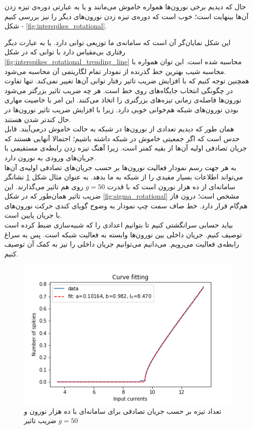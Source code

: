 حال که دیدیم برخی نورون‌ها همواره خاموش می‌مانند و یا به عبارتی دوره‌ی تیزه زدن آن‌ها بینهایت است؛ خوب است که دوره‌ی تیزه زدن‌ نورون‌های دیگر را نیز بررسی کنیم - شکل \ref{fig:interspikes_rotational}.

این شکل نمایان‌گر آن است که سامانه‌ی ما توزیعی توانی دارد. یا به عبارت دیگر رفتاری بی‌مقیاس دارد با توانی که در شکل  
\ref{fig:interspikes_rotational_trending_line}
محاسبه شده است. این توان همواره با محاسبه شیب بهترین خط گذرنده از نمودار تمام لگاریتمی آن محاسبه می‌شود.\\

همچنین توجه کنیم که با افزایش ضریب تاثیر رفتار توانی آن‌ها تغییر نمی‌کند. تنها تفاوت در چگونگی انتخاب جایگاه‌های روی خط است. هر چه ضریب تاثیر بزرگتر می‌شود نورون‌ها فاصله‌ی زمانی تیزه‌های بزرگتری را اتخاذ می‌کنند. این امر با خاصیت مهاری بودن نورون‌های شبکه هم‌خوانی خوبی دارد. زیرا با افزایش ضریب تاثیر نورون‌ها در حال کندتر شدن هستند.
\\


همان طور که دیدیم تعدادی از نورون‌ها در شبکه به حالت خاموش درمی‌آیند. قابل حدس است که اگر جمعیتی خاموش در شبکه داشته باشیم؛ احتمالا آنهایی هستند که جریان تصادفی اولیه آن‌ها از بقیه کمتر است. زیرا آهنگ تیزه زدن رابطه‌ی مستقیمی با جریان‌های ورودی به نورون دارد.\\

به هر جهت رسم نمودار فعالیت نورون‌ها بر حسب جریان‌های تصادفی اولیه‌ی آن‌ها می‌تواند اطلاعات بسیار مفیدی را از شبکه به ما بدهد. به عنوان مثال شکل \ref{fig:spikes_num_vs_background_current} نشانگر سامانه‌ای از ده هزار نورون است که با قدرت $g=50$ روی هم تاثیر می‌گذارند. این ضریب تاثیر همان‌طور که در شکل
\ref{fig:sigma_rotational}
مشخص است؛ درون فاز هم‌گام قرار دارد. خط صاف سمت چپ نمودار به وضوح گویای کندی حرکت نورون‌های با جریان پایین است.\\

بیاید حسابی سرانگشتی کنیم تا بتوانیم اعدادی را که شبیه‌سازی ضبط کرده است توصیف کنیم. جریان داخلی بین نورون‌ها وابسته به فعالیت شبکه است. پس به سراغ رابطه‌ی فعالیت می‌رویم. می‌دانیم می‌توانیم جریان داخلی را نیز به کمک آن توصیف کنیم.
\begin{figure}
	\centering
	\includegraphics[width = 0.7 \textwidth]{../papers_studies/figs/Rotational/spikies_num_vs_input_fitted_curve_g50_input_3.5_13.5.png}
	\caption{تعداد تیزه بر حسب جریان تصادفی برای سامانه‌ای با ده هزار نورون و ضریب تاثیر $g=50$}
	\label{fig:spikes_num_vs_background_current}
\end{figure}


